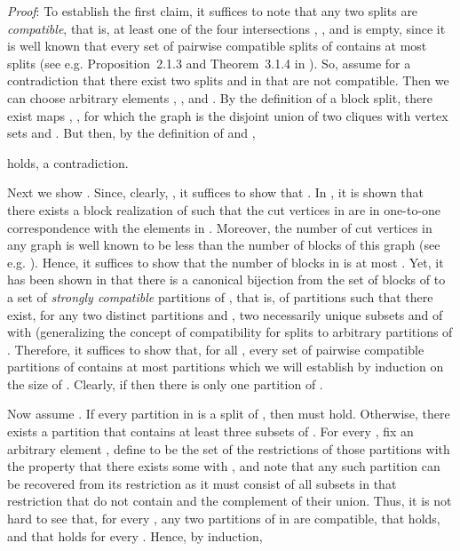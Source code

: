 \documentclass[12pt]{article}
\begin{document}
\noindent\textsl{Proof}:
To establish the first claim, it suffices to
note that any two splits  
are \emph{compatible}, that is, at least one 
of the four intersections , , 
 and  is empty, since it
is well known that every set of pairwise compatible splits of
 contains at most  splits (see e.g. Proposition~2.1.3 and 
Theorem~3.1.4 in \cite{sem-ste-03a}). 
So, assume for a contradiction that there exist two splits 
and  in  that are not compatible. Then we can
choose arbitrary elements , ,
 and . By the definition
of a block split, there exist maps , , 
for which the graph  is the 
disjoint union of two cliques with vertex sets  and .
But then, by the definition of  and ,

holds, a contradiction. 

Next we show . Since, clearly, , it
suffices to show that . In \cite{dre-hub-koo-08a},
it is shown that there exists a block realization  of  such that
the cut vertices in  are in one-to-one correspondence with the elements
in . Moreover, the number of cut vertices in any graph
is well known to be less than the number of blocks of this graph (see e.g. \cite{har-pri-66a}).
Hence, it suffices to show that the number of blocks in  is at most . 
Yet, it has been shown in \cite{dress:huber:compatible:decompositions:2008} that
there is a canonical bijection from the set of blocks of  to a set  of
\emph{\!strongly compatible} partitions of , that is, of 
partitions such that there exist, for any two distinct partitions 
 and , two necessarily unique subsets  and  of  with 
 (generalizing the concept of compatibility
for splits to arbitrary partitions of . 
Therefore, it suffices to show that, for all , every set of pairwise compatible partitions of 
contains at most  partitions which we will establish 
by induction on the size of . Clearly, if  then there is only one partition of .

Now assume . If every partition in  is
a split of , then  must hold.
Otherwise, there exists a partition  that
contains at least three subsets of . For every , fix
an arbitrary element , define
 to be the set of the restrictions  of those partitions  
 with the property that there exists some  with , and note that any such partition  can be recovered from its restriction  as it must consist of all subsets  in that restriction that do not contain  and the complement of their union. Thus, it is not hard to see that, for every , any
two partitions of  in  are compatible,
that  holds, and that  holds for every . Hence, by induction,
 
\end{document}
